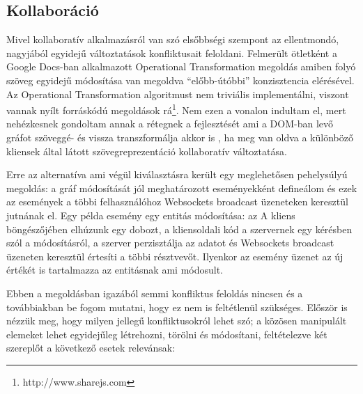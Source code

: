\subsection{Kollaboráció}

Mivel kollaboratív alkalmazásról van szó elsőbbségi szempont az ellentmondó, nagyjából egyidejű változtatások konfliktusait feloldani. Felmerült ötletként a Google Docs-ban alkalmazott Operational Transformation megoldás amiben folyó szöveg egyidejű módosítása van megoldva ``előbb-útóbbi'' konzisztencia elérésével. Az Operational Transformation algoritmust nem triviális implementálni, viszont vannak nyílt forráskódú megoldások rá\footnote{http://www.sharejs.com}. Nem ezen a vonalon indultam el, mert nehézkesnek gondoltam annak a rétegnek a fejlesztését ami a DOM-ban levő gráfot szöveggé- és vissza transzformálja akkor is , ha meg van oldva a különböző kliensek által látott szövegreprezentáció kollaboratív változtatása. 

Erre az alternatíva ami végül kiválasztásra került egy meglehetősen pehelysúlyú megoldás: a gráf módosítását jól meghatározott eseményekként defineálom és ezek az események a többi felhasználóhoz Websockets broadcast üzeneteken keresztül jutnának el. Egy példa esemény egy entitás módosítása: az A kliens böngészőjében elhúzunk egy dobozt, a kliensoldali kód a szervernek egy kérésben szól a módosításról, a szerver perzisztálja az adatot és Websockets broadcast üzeneten keresztül értesíti a többi résztvevőt. Ilyenkor az esemény üzenet az új értékét is tartalmazza az entitásnak ami módosult. 

Ebben a megoldásban igazából semmi konfliktus feloldás nincsen és a továbbiakban be fogom mutatni, hogy ez nem is feltétlenül szükséges. Először is nézzük meg, hogy milyen jellegű konfliktusokról lehet szó; a közösen manipulált elemeket lehet egyidejűleg létrehozni, törölni és módosítani, feltételezve két szereplőt a következő esetek relevánsak:

